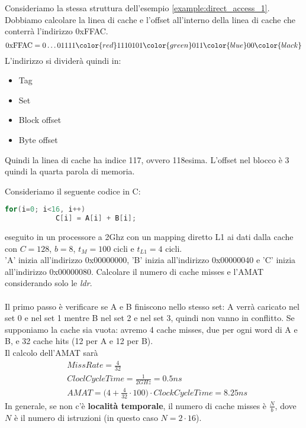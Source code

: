 \begin{example}
   Consideriamo la stessa struttura dell'esempio \ref{example:direct_access_1}. Dobbiamo calcolare la linea di cache e l'offset all'interno della linea
    di cache che conterrà l'indirizzo 0xFFAC.\\
    \begin{equation*}
    	\text{0xFFAC} = 0\ldots01111 \color{red}1110 101\color{green}0 11\color{blue}00\color{black} 
    \end{equation*}
    L'indirizzo si dividerà quindi in:
    \begin{itemize}
    	\item Tag
    	\item \color{red}Set\color{black}
    	\item \color{green}Block offset\color{black}
    	\item \color{blue}Byte offset \color{black}
    \end{itemize}
    Quindi la linea di cache ha indice 117, ovvero 118esima. L'offset nel blocco è 3 quindi la quarta parola di memoria.
\end{example}

\begin{example}
    Consideriamo il seguente codice in C:
    \begin{lstlisting}[language=C]
    	for(i=0; i<16, i++)
    		C[i] = A[i] + B[i];
    \end{lstlisting}
    eseguito in un processore a 2Ghz con un mapping diretto L1 ai dati dalla cache con $C = 128$, $b=8$, \(t_M = 100\) cicli e \(t_{L1} = 4\) cicli.\\
    'A' inizia all'indirizzo 0x00000000, 'B' inizia all'indirizzo 0x00000040 e 'C' inizia all'indirizzo 0x00000080. Calcolare il numero di cache misses e l'AMAT considerando solo le \emph{ldr}.\\\\
    Il primo passo è verificare se A e B finiscono nello stesso set: A verrà caricato nel set 0 e nel set 1 mentre B nel set 2 e nel set 3, quindi non vanno in conflitto.
    Se supponiamo la cache sia vuota: avremo 4 cache misses, due per ogni word di A e B, e 32 cache hits (12 per A e 12 per B).\\
    Il calcolo dell'AMAT sarà
    \begin{equation*}
    	\begin{split}
    		&MissRate = \frac{4}{32}\\
    		&CloclCycleTime=\frac{1}{2GHz}=0.5ns\\
    		&AMAT=\bigg(4+\frac{4}{32} \cdot 100\bigg) \cdot ClockCycleTime = 8.25ns
    	\end{split}
    \end{equation*}
    In generale, se non c'è \textbf{località temporale}, il numero di cache misses è $\frac{N}{b}$, dove $N$ è il numero di istruzioni (in questo caso $N=2\cdot16$).
\end{example}

